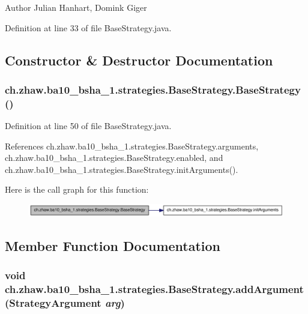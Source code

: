 \begin{DoxyAuthor}{Author}
Julian Hanhart, Domink Giger 
\end{DoxyAuthor}


Definition at line 33 of file BaseStrategy.java.

\subsection{Constructor \& Destructor Documentation}
\hypertarget{classch_1_1zhaw_1_1ba10__bsha__1_1_1strategies_1_1BaseStrategy_a22dc9cd6d939460308ad8d065e4ec646}{
\subsubsection[{BaseStrategy}]{\setlength{\rightskip}{0pt plus 5cm}ch.zhaw.ba10\_\-bsha\_\-1.strategies.BaseStrategy.BaseStrategy ()}}
\label{classch_1_1zhaw_1_1ba10__bsha__1_1_1strategies_1_1BaseStrategy_a22dc9cd6d939460308ad8d065e4ec646}


Definition at line 50 of file BaseStrategy.java.

References ch.zhaw.ba10\_\-bsha\_\-1.strategies.BaseStrategy.arguments, ch.zhaw.ba10\_\-bsha\_\-1.strategies.BaseStrategy.enabled, and ch.zhaw.ba10\_\-bsha\_\-1.strategies.BaseStrategy.initArguments().

Here is the call graph for this function:\nopagebreak
\begin{figure}[H]
\begin{center}
\leavevmode
\includegraphics[width=324pt]{classch_1_1zhaw_1_1ba10__bsha__1_1_1strategies_1_1BaseStrategy_a22dc9cd6d939460308ad8d065e4ec646_cgraph}
\end{center}
\end{figure}


\subsection{Member Function Documentation}
\hypertarget{classch_1_1zhaw_1_1ba10__bsha__1_1_1strategies_1_1BaseStrategy_ad106d9d501550fe475a4a01032632597}{
\subsubsection[{addArgument}]{\setlength{\rightskip}{0pt plus 5cm}void ch.zhaw.ba10\_\-bsha\_\-1.strategies.BaseStrategy.addArgument ({\bf StrategyArgument} {\em arg})}}
\label{classch_1_1zhaw_1_1ba10__bsha__1_1_1strategies_1_1BaseStrategy_ad106d9d501550fe475a4a01032632597}


